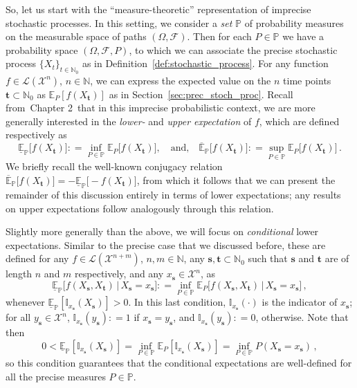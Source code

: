\documentclass[graybox]{svmult}
\newcommand{\nats}{\mathbb{N}}
\newcommand{\natswith}{\nats_{0}}
\newcommand{\states}{\mathcal{X}}
\newcommand{\gambles}{\mathcal{L}}
\newcommand{\coloneqq}{:\!=}
\def\refIPChapter{Chapter 2}
\begin{document}
So, let us start with the ``measure-theoretic'' representation of imprecise stochastic processes. In this setting, we consider a \emph{set} $\mathbb{P}$ of probability measures on the measurable space of paths $(\Omega,\mathcal{F})$. Then for each $P\in\mathbb{P}$ we have a probability space $(\Omega,\mathcal{F},P)$, to which we can associate the precise stochastic process $\{X_t\}_{t\in\natswith}$ as in Definition~\ref{def:stochastic_process}. For any function $f\in\gambles(\states^n)$, $n\in\nats$, we can express the expected value on the $n$ time points $\mathbf{t}\subset\natswith$ as $\mathbb{E}_P[f(X_\mathbf{t})]$ as in Section~\ref{sec:prec_stoch_proc}. Recall from~\refIPChapter~that in this imprecise probabilistic context, we are more generally interested in the \emph{lower-} and \emph{upper expectation} of $f$, which are defined respectively as
\begin{equation*}
\underline{\mathbb{E}}_\mathbb{P}\bigl[f(X_\mathbf{t})\bigr] \coloneqq \inf_{P\in\mathbb{P}} \mathbb{E}_P\bigl[f(X_\mathbf{t})\bigr],\quad\text{and,}\quad \overline{\mathbb{E}}_\mathbb{P}\bigl[f(X_\mathbf{t})\bigr] \coloneqq \sup_{P\in\mathbb{P}} \mathbb{E}_P\bigl[f(X_\mathbf{t})\bigr]\,.
\end{equation*}
We briefly recall the well-known conjugacy relation $\overline{\mathbb{E}}_\mathbb{P}\bigl[f(X_\mathbf{t})\bigr]=-\underline{\mathbb{E}}_\mathbb{P}\bigl[-f(X_\mathbf{t})\bigr]$, from which it follows that we can present the remainder of this discussion entirely in terms of lower expectations; any results on upper expectations follow analogously through this relation.

Slightly more generally than the above, we will focus on \emph{conditional} lower expectations. Similar to the precise case that we discussed before, these are defined for any $f\in\gambles(\states^{n+m})$, $n,m\in\nats$, any $\mathbf{s},\mathbf{t}\subset\natswith$ such that $\mathbf{s}$ and $\mathbf{t}$ are of length $n$ and $m$ respectively, and any $x_\mathbf{s}\in\states^n$, as
\begin{equation*}
\underline{\mathbb{E}}_\mathbb{P}\bigl[f(X_\mathbf{s},X_\mathbf{t})\,\big\vert\,X_\mathbf{s}=x_\mathbf{s}\bigr] \coloneqq \inf_{P\in\mathbb{P}} \mathbb{E}_P \bigl[f(X_\mathbf{s},X_\mathbf{t})\,\big\vert\,X_\mathbf{s}=x_\mathbf{s}\bigr]\,,
\end{equation*}
whenever $\underline{\mathbb{E}}_\mathbb{P}[\mathbb{I}_{x_\mathbf{s}}(X_\mathbf{s})]>0$. In this last condition, $\mathbb{I}_{x_\mathbf{s}}(\cdot)$ is the indicator of $x_\mathbf{s}$; for all $y_\mathbf{s}\in\states^n$, $\mathbb{I}_{x_\mathbf{s}}(y_\mathbf{s})\coloneqq 1$ if $x_\mathbf{s}=y_\mathbf{s}$, and $\mathbb{I}_{x_\mathbf{s}}(y_\mathbf{s})\coloneqq 0$, otherwise. Note that then
\begin{equation*}
0 < \underline{\mathbb{E}}_\mathbb{P}[\mathbb{I}_{x_\mathbf{s}}(X_\mathbf{s})] = \inf_{P\in\mathbb{P}} \mathbb{E}_P[\mathbb{I}_{x_\mathbf{s}}(X_\mathbf{s})] = \inf_{P\in\mathbb{P}} P(X_\mathbf{s}=x_\mathbf{s})\,,
\end{equation*}
so this condition guarantees that the conditional expectations are well-defined for all the precise measures $P\in\mathbb{P}$.
\end{document}
